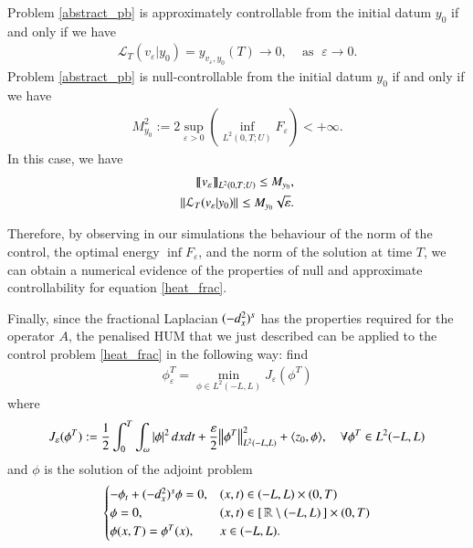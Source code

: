 \begin{theorem}\label{theorem_hum}
Problem \eqref{abstract_pb} is approximately controllable from the initial datum $y_0$ if and only if we have
\begin{align}\label{approx_control_cond}
	\mathcal{L}_T(v_\varepsilon|y_0) = y_{v_\varepsilon,y_0}(T)\rightarrow 0,\;\;\;\textrm{ as }\;\varepsilon\to 0.
\end{align}
Problem \eqref{abstract_pb} is null-controllable from the initial datum $y_0$ if and only if we have
\begin{align}\label{null_control_cond}
	M_{y_0}^2:=2\sup_{\varepsilon>0}\left( \inf_{L^2(0,T;U)}F_\varepsilon\right)<+\infty.
\end{align}
In this case, we have 
\begin{align}\label{null_control_est}
	\llbracket v_\varepsilon\rrbracket_{L^2(0,T;U)}\leq M_{y_0},\nonumber
	\\
	{\left\|\mathcal L_T(v_\varepsilon|y_0)\right\|}_{}\leq M_{y_0}\sqrt{\varepsilon}.
\end{align} 
\end{theorem} 

Therefore, by observing in our simulations the behaviour of the norm of the control, the optimal energy $\inf F_\varepsilon$, and the norm of the solution at time $T$, we can obtain a numerical evidence of the properties of null and approximate controllability for equation \eqref{heat_frac}. 

Finally, since the fractional Laplacian $(-d_x^2)^{s}$ has the properties required for the operator $A$, the penalised HUM that we just described can be applied to the control problem \eqref{heat_frac} in the following way: find
\begin{align*}
	\phi^T_\varepsilon=\min_{\phi\in L^2(-L,L)} J_\varepsilon (\phi^T)
\end{align*}
where 
\begin{align*}
	J_\varepsilon(\phi^T):=\frac{1}{2}\int_0^T\int_{\omega}|\phi|^2\,dxdt+\frac{\varepsilon}{2}{\left\|\phi^T\right\|}_{L^2(-L,L)}^2 + \langle z_0,\phi\rangle, \quad \forall \phi^T\in L^2(-L,L) 
\end{align*}
and $\phi$ is the solution of the adjoint problem
\begin{align*}
	\begin{cases}
		-\phi_t + (-d_x^2)^{s}\phi = 0, & (x,t)\in (-L,L)\times(0,T)
		\\
		\phi = 0, & (x,t)\in [\,\mathbb{R}\setminus(-L,L)\,]\times(0,T)
		\\
		\phi(x,T) = \phi^T(x), & x\in (-L,L).
	\end{cases}
\end{align*}
